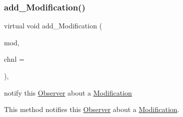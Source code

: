 \subsubsection{\texorpdfstring{add\+\_\+\+Modification()}{add\_Modification()}}
{\footnotesize\ttfamily virtual void add\+\_\+\+Modification (\begin{DoxyParamCaption}\item[{\mbox{\hyperlink{group___modification___t_y_p_e_s_ga9024cf2ead61a1280d29771b063b1a62}{sp\+\_\+\+Mod}}}]{mod,  }\item[{\mbox{\hyperlink{class_s_m_spp__di__unipi__it_1_1_observer_a54ce8db639626e45b1f20c289baa989b}{Chnl\+Name}}}]{chnl = {} }\end{DoxyParamCaption})\hspace{0.3cm}{\ttfamily [override]}, {\ttfamily [virtual]}}



notify this \mbox{\hyperlink{class_s_m_spp__di__unipi__it_1_1_observer}{Observer}} about a \mbox{\hyperlink{class_s_m_spp__di__unipi__it_1_1_modification}{Modification}} 

This method notifies this \mbox{\hyperlink{class_s_m_spp__di__unipi__it_1_1_observer}{Observer}} about a \mbox{\hyperlink{class_s_m_spp__di__unipi__it_1_1_modification}{Modification}}.

